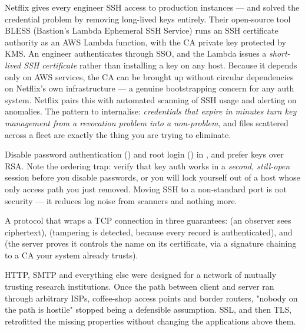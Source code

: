  Netflix gives every engineer SSH access to production instances --- and solved the credential problem by removing long-lived keys entirely. Their open-source tool BLESS (Bastion's Lambda Ephemeral SSH Service) runs an SSH certificate authority as an AWS Lambda function, with the CA private key protected by KMS. An engineer authenticates through SSO, and the Lambda issues a \emph{short-lived SSH certificate} rather than installing a key on any host. Because it depends only on AWS services, the CA can be brought up without circular dependencies on Netflix's own infrastructure --- a genuine bootstrapping concern for any auth system. Netflix pairs this with automated scanning of SSH usage and alerting on anomalies. The pattern to internalise: \emph{credentials that expire in minutes turn key management from a revocation problem into a non-problem}, and  files scattered across a fleet are exactly the thing you are trying to eliminate.

\begin{secwarn}
Disable password authentication () and root login () in , and prefer  keys over RSA. Note the ordering trap: verify that key auth works in a \emph{second, still-open} session before you disable passwords, or you will lock yourself out of a host whose only access path you just removed. Moving SSH to a non-standard port is not security --- it reduces log noise from scanners and nothing more.
\end{secwarn}


 A protocol that wraps a TCP connection in three guarantees:  (an observer sees ciphertext),  (tampering is detected, because every record is authenticated), and  (the server proves it controls the name on its certificate, via a signature chaining to a CA your system already trusts).

 HTTP, SMTP and everything else were designed for a network of mutually trusting research institutions. Once the path between client and server ran through arbitrary ISPs, coffee-shop access points and border routers, "nobody on the path is hostile" stopped being a defensible assumption. SSL, and then TLS, retrofitted the missing properties without changing the applications above them.

